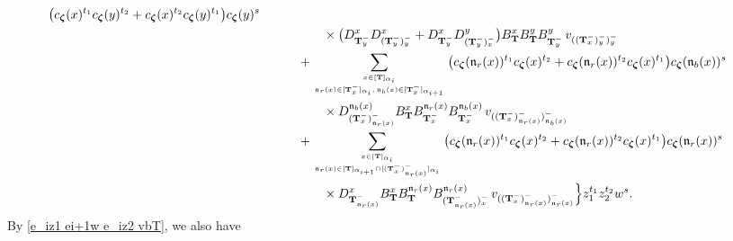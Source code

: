 \documentclass[12pt]{amsart}
\numberwithin{equation}{thm}
\newcommand\bT{\mathbf T}
\newcommand\fn{\mathfrak n}
\renewcommand\a{\alpha}  %
\newcommand\Bz{\boldsymbol\zeta}
\begin{document}
\begin{align}
		\big( c_{\Bz} (x)^{t_1} c_{\Bz} (y)^{t_2} + c_{\Bz}(x)^{t_2} c_{\Bz} (y)^{t_1} \big) c_{\Bz} (y)^s 
		\\ \notag & \hspace{5em} \times 
		\big( D_{\bT_y^-}^x D_{(\bT_y^-)_y^-}^x + D_{\bT_y^-}^x D_{(\bT_y^-)_x^-}^y \big)
		B_{\bT}^x B_{\bT}^y B_{\bT_y^-}^y 
		\, v_{((\bT_x^-)_y^-)_y^-} 
	\\ \notag & \hspace{3em} 
	+ \sum_{x \in [\bT]_{\a_i} \atop \fn_r(x) \in [\bT_x^-]_{\a_i}, \, \fn_b(x) \in [\bT_x^-]_{\a_{i+1}}} 
		\big( c_{\Bz} (\fn_r (x))^{t_1} c_{\Bz} (x)^{t_2} + c_{\Bz} (\fn_r (x))^{t_2} c_{\Bz} (x)^{t_1} \big) c_{\Bz} (\fn_b(x))^s  
		\\ \notag & \hspace{5em} \times 
		D_{(\bT_x^-)_{\fn_r (x)}^-}^{\fn_b(x)} 
		B_{\bT}^x B_{\bT_x^-}^{\fn_r(x)} B_{\bT_x^-}^{\fn_b(x)} 
		\, v_{((\bT_x^-)_{\fn_r(x)}^-)_{\fn_b(x)}^-} 
	\\ \notag & \hspace{3em} 
	+ \sum_{x \in [\bT]_{\a_i} \atop \fn_r(x) \in [\bT]_{\a_{i+1}}\cap [(\bT_x^-)_{\fn_r(x)}^-]_{\a_i}} 
		\big( c_{\Bz} (\fn_r (x))^{t_1} c_{\Bz} (x)^{t_2} + c_{\Bz}(\fn_r(x))^{t_2} c_{\Bz} (x)^{t_1} \big) c_{\Bz} (\fn_r(x))^s 
		\\ \notag & \hspace{5em} \times 
		D_{\bT_{\fn_r(x)}^-}^x B_{\bT}^x B_{\bT}^{\fn_r(x)} B_{(\bT_{\fn_r(x)}^-)_x^-}^{\fn_r(x)} 
		\, v_{((\bT_x^-)_{\fn_r(x)}^-)_{\fn_r(x)}^-} 
	\Big\} z_1^{t_1} z_2^{t_2} w^s. 
\end{align}
By \eqref{e_iz1 ei+1w e_iz2 vbT}, we also have 
\end{document}
